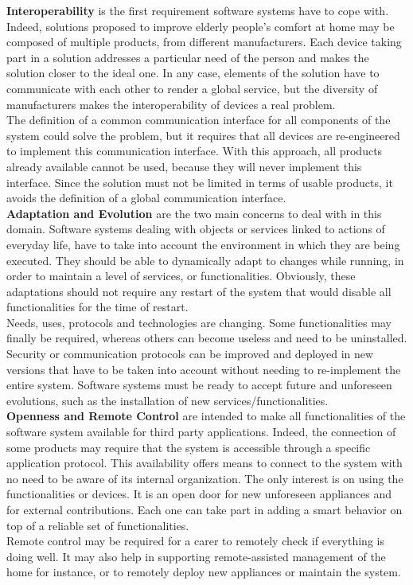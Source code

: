 {\bf Interoperability} is the first requirement software systems have to cope with. Indeed, solutions proposed to improve elderly people's comfort at home may be composed of multiple products, from different manufacturers. Each device taking part in a solution addresses a particular need of the person and makes the solution closer to the ideal one. In any case, elements of the solution have to communicate with each other to render a global service, but the diversity of manufacturers makes the interoperability of devices a real problem.\\
The definition of a common communication interface for all components of the system could solve the problem, but it requires that all devices are re-engineered to implement this communication interface. With this approach, all products already available cannot be used, because they will never implement this interface. Since the solution must not be limited in terms of usable products, it avoids the definition of a global communication interface.\\

{\bf Adaptation and Evolution} are the two main concerns to deal with in this domain. Software systems dealing with objects or services linked to actions of everyday life, have to take into account the environment in which they are being executed. They should be able to dynamically adapt to changes while running, in order to maintain a level of services, or functionalities. Obviously, these adaptations should not require any restart of the system that would disable all functionalities for the time of restart.\\
Needs, uses, protocols and technologies are changing. Some functionalities may finally be required, whereas others can become useless and need to be uninstalled. Security or communication protocols can be improved and deployed in new versions that have to be taken into account without needing to re-implement the entire system. Software systems must be ready to accept future and unforeseen evolutions, such as the installation of new services/functionalities.\\

{\bf Openness and Remote Control} are intended to make all functionalities of the software system available for third party applications. Indeed, the connection of some products may require that the system is accessible through a specific application protocol. This availability offers means to connect to the system with no need to be aware of its internal organization. The only interest is on using the functionalities or devices. It is an open door for new unforeseen appliances and for external contributions. Each one can take part in adding a smart behavior on top of a reliable set of functionalities.\\
Remote control may be required for a carer to remotely check if everything is doing well. It may also help in supporting remote-assisted management of the home for instance, or to remotely deploy new appliances or maintain the system.\\

